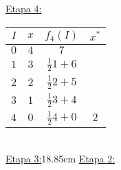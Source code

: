 \documentclass[MIOP.tex]{subfiles}
\begin{document}
\begin{solucion}
\underline{Etapa 4:}\

\begin{tabular}{|c| c| c| c |}
\hline
$I$ & $x$ & $f_4(I)$ & $x^* $ \\
\hline
$0$ & $4$ & $7$ &  \\
\hline
$1$ & $3$ & $\frac{1}{2}1+6$ & \\
\hline
$2$ & $2$ & $\frac{1}{2}2+5$ & \\
\hline
$3$ & $1$ & $\frac{1}{2}3+4$ &  \\
\hline
$4$ & $0$ & $\frac{1}{2}4+0$ & $\boxed{2}$ \\
\hline
\end{tabular}\
\\

\underline{Etapa 3:}\kern 18.85em \underline{Etapa 2:}


\end{solucion}
\end{document}
